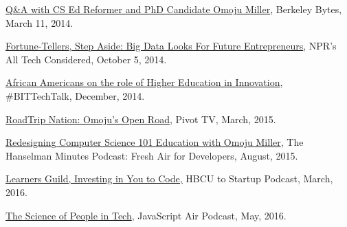 \documentclass[11pt,article,oneside]{memoir}
\begin{document}
\ind \href{http://best.berkeley.edu/2015/03/11/best-labber-in-berkeley-byte-qa-with-cs-ed-reformer-and-phd-candidate-omoju-miller/}{Q\&A with CS Ed Reformer and PhD Candidate Omoju Miller}, Berkeley Bytes, March 11, 2014.

\ind \href{http://www.npr.org/sections/alltechconsidered/2014/10/05/351851015/fortune-tellers-step-aside-big-data-looks-for-future-entrepreneurs}{Fortune-Tellers, Step Aside: Big Data Looks For Future Entrepreneurs}, NPR's  All Tech Considered, October 5, 2014.

\ind \href{https://www.blacksintechnology.net/the-road-to-50-podcast-african-americans-on-the-role-of-higher-education-in-innovation/}{African Americans on the role of Higher Education in Innovation}, \#BITTechTalk, December, 2014.

\ind \href{http://roadtripnation.com/leader/omoju-miller}{RoadTrip Nation: Omoju's Open Road}, Pivot TV, March, 2015.

\ind \href{http://hanselminutes.com/488/redesigning-computer-science-101-education-with-omoju-miller}{Redesigning Computer Science 101 Education with Omoju Miller}, The Hanselman Minutes Podcast: Fresh Air for Developers, August, 2015.

\ind \href{https://www.youtube.com/watch?v=T0wQRr4RuqM&ab_channel=HBCUtoStartup}{Learners Guild, Investing in You to Code,} HBCU to Startup Podcast, March, 2016.

\ind \href{http://audio.javascriptair.com/e/022-jsair-the-science-of-people-in-tech-with-kate-edwards-omoju-miller-and-steve-andrews/}{The Science of People in Tech}, JavaScript Air Podcast, May, 2016.
\end{document}
